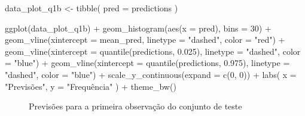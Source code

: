 \documentclass[
  a4paperpaper,
]{article}
\newenvironment{Shaded}{\begin{snugshade}}{\end{snugshade}}
\newcommand{\AttributeTok}[1]{\textcolor[rgb]{0.40,0.45,0.13}{#1}}
\newcommand{\DecValTok}[1]{\textcolor[rgb]{0.68,0.00,0.00}{#1}}
\newcommand{\FloatTok}[1]{\textcolor[rgb]{0.68,0.00,0.00}{#1}}
\newcommand{\FunctionTok}[1]{\textcolor[rgb]{0.28,0.35,0.67}{#1}}
\newcommand{\NormalTok}[1]{\textcolor[rgb]{0.00,0.23,0.31}{#1}}
\newcommand{\OtherTok}[1]{\textcolor[rgb]{0.00,0.23,0.31}{#1}}
\newcommand{\SpecialCharTok}[1]{\textcolor[rgb]{0.37,0.37,0.37}{#1}}
\newcommand{\StringTok}[1]{\textcolor[rgb]{0.13,0.47,0.30}{#1}}
\begin{document}
\begin{Shaded}
\begin{Highlighting}[]
\NormalTok{data\_plot\_q1b }\OtherTok{\textless{}{-}} \FunctionTok{tibble}\NormalTok{(}
  \AttributeTok{pred =}\NormalTok{ predictions}
\NormalTok{)}

\FunctionTok{ggplot}\NormalTok{(data\_plot\_q1b) }\SpecialCharTok{+}
  \FunctionTok{geom\_histogram}\NormalTok{(}\FunctionTok{aes}\NormalTok{(}\AttributeTok{x =}\NormalTok{ pred), }\AttributeTok{bins =} \DecValTok{30}\NormalTok{) }\SpecialCharTok{+}
  \FunctionTok{geom\_vline}\NormalTok{(}\AttributeTok{xintercept =}\NormalTok{ mean\_pred, }\AttributeTok{linetype =} \StringTok{"dashed"}\NormalTok{, }\AttributeTok{color =} \StringTok{"red"}\NormalTok{) }\SpecialCharTok{+}
  \FunctionTok{geom\_vline}\NormalTok{(}\AttributeTok{xintercept =} \FunctionTok{quantile}\NormalTok{(predictions, }\FloatTok{0.025}\NormalTok{), }\AttributeTok{linetype =} \StringTok{"dashed"}\NormalTok{, }\AttributeTok{color =} \StringTok{"blue"}\NormalTok{) }\SpecialCharTok{+}
  \FunctionTok{geom\_vline}\NormalTok{(}\AttributeTok{xintercept =} \FunctionTok{quantile}\NormalTok{(predictions, }\FloatTok{0.975}\NormalTok{), }\AttributeTok{linetype =} \StringTok{"dashed"}\NormalTok{, }\AttributeTok{color =} \StringTok{"blue"}\NormalTok{) }\SpecialCharTok{+}
  \FunctionTok{scale\_y\_continuous}\NormalTok{(}\AttributeTok{expand =} \FunctionTok{c}\NormalTok{(}\DecValTok{0}\NormalTok{, }\DecValTok{0}\NormalTok{)) }\SpecialCharTok{+}
  \FunctionTok{labs}\NormalTok{(}
    \AttributeTok{x =} \StringTok{"Previsões"}\NormalTok{,}
    \AttributeTok{y =} \StringTok{"Frequência"}
\NormalTok{  ) }\SpecialCharTok{+}
  \FunctionTok{theme\_bw}\NormalTok{()}
\end{Highlighting}
\end{Shaded}

\begin{figure}[H]


\caption{\label{fig-previsoesq1b}Previsões para a primeira observação do
conjunto de teste}

\end{figure}%
\end{document}
